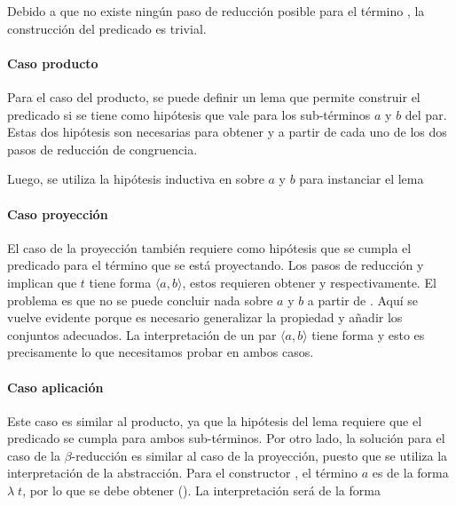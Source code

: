 Debido a que no existe ningún paso de reducción posible para el término \const{$\star$}, la construcción del predicado es trivial.


\paragraph{Caso producto}

Para el caso del producto, se puede definir un lema que permite construir el predicado si se tiene como hipótesis que \snstar vale para los sub-términos $a$ y $b$ del par.
Estas dos hipótesis son necesarias para obtener \snstar {} y \snstar {} a partir de cada uno de los dos pasos de reducción de congruencia.


Luego, se utiliza la hipótesis inductiva en  sobre $a$ y $b$ para instanciar el lema


\paragraph{Caso proyección}

El caso de la proyección también requiere como hipótesis que se cumpla el predicado para el término que se está proyectando.
Los pasos de reducción  y  implican que $t$ tiene forma $\langle a, b \rangle$, estos requieren obtener \snstar {} y \snstar {} respectivamente.
El problema es que no se puede concluir nada sobre $a$ y $b$ a partir de .
Aquí se vuelve evidente porque es necesario generalizar la propiedad  y añadir los conjuntos adecuados.
La interpretación de un par $\langle a, b \rangle$ tiene forma \snstar{}  \snstar{} y esto es precisamente lo que necesitamos probar en ambos casos.


\paragraph{Caso aplicación}

Este caso es similar al producto, ya que la hipótesis del lema requiere que el predicado se cumpla para ambos sub-términos.
Por otro lado, la solución para el caso de la $\beta$-reducción es similar al caso de la proyección, puesto que se utiliza la interpretación de la abstracción.
Para el constructor , el término $a$ es de la forma $\lambda\; t$, por lo que se debe obtener
\snstar(\func{[}\func{]}).
La interpretación  será de la forma
\snstar{}
\snstar{}

